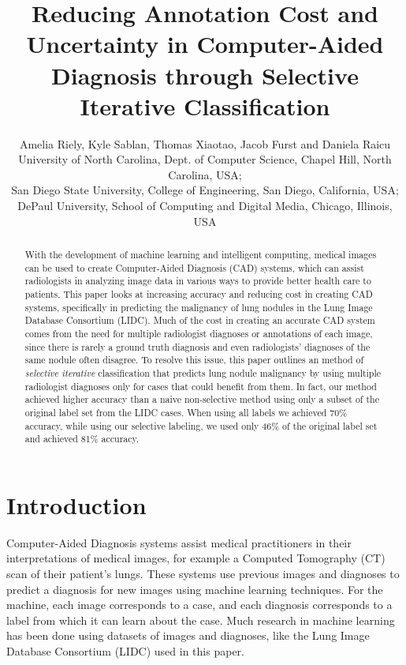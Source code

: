 \documentclass[]{spie}
\title{Reducing Annotation Cost and Uncertainty in Computer-Aided Diagnosis through Selective Iterative Classification}
\author{Amelia Riely\supit{a}, Kyle Sablan\supit{b},
Thomas Xiaotao\supit{c}, Jacob Furst\supit{c} and
Daniela Raicu\supit{c}
\skiplinehalf
\supit{a}University of North Carolina, Dept. of Computer Science, Chapel Hill, North Carolina, USA; \\
\supit{b}San Diego State University, College of Engineering, San Diego, California, USA;\\
\supit{c}DePaul University, School of Computing and Digital Media, Chicago, Illinois, USA\\
}
\begin{document}
  \maketitle
 
\begin{abstract}
With the development of machine learning and intelligent computing, medical images can be used to create Computer-Aided Diagnosis (CAD) systems, which can assist radiologists in analyzing image data in various ways to provide better health care to patients. This paper looks at increasing accuracy and reducing cost in creating CAD systems, specifically in predicting the malignancy of lung nodules in the Lung Image Database Consortium (LIDC). Much of the cost in creating an accurate CAD system comes from the need for multiple radiologist diagnoses or annotations of each image, since there is rarely a ground truth diagnosis and even radiologists' diagnoses of the same nodule often disagree. To resolve this issue, this paper outlines an method of \textit{selective iterative} classification that predicts lung nodule malignancy by using multiple radiologist diagnoses only for cases that could benefit from them. In fact, our method achieved higher accuracy than a naive non-selective method using only a subset of the original label set from the LIDC cases. When using all labels we achieved 70\% accuracy, while using our selective labeling, we used only 46\% of the original label set and achieved 81\% accuracy.
\end{abstract}
 

\section{Introduction}
\label{sec:intro}
Computer-Aided Diagnosis systems assist medical practitioners in their interpretations of medical images, for example a Computed Tomography (CT) scan of their patient's lungs. These systems use previous images and diagnoses to predict a diagnosis for new images using machine learning techniques. For the machine, each image corresponds to a case, and each diagnosis corresponds to a label from which it can learn about the case. Much research in machine learning has been done using datasets of images and diagnoses, like the Lung Image Database Consortium (LIDC) used in this paper. 
\end{document}
